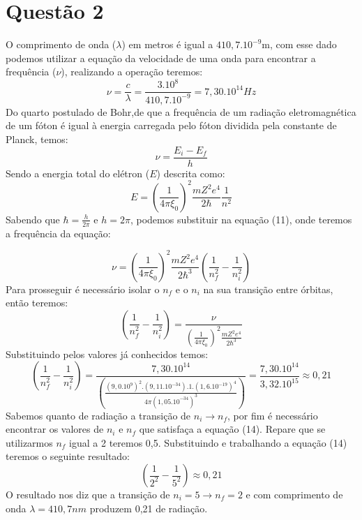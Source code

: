\documentclass{article}
\begin{document}
\section {Questão 2}
O comprimento de onda ($\lambda$) em metros é igual a $410,7.10^{-9}$m, com esse dado podemos utilizar a equação da velocidade de uma onda para encontrar a frequência ($\nu$), realizando a operação teremos:
\begin{equation}
    { \nu = \frac{c}{\lambda} = \frac{3.10^{8}}{410,7.10^{-9}} = 7,30.10^{14}Hz}
\end{equation}
Do quarto postulado de Bohr,de que a frequência de um radiação eletromagnética de um fóton é igual à energia carregada pelo fóton dividida pela constante de Planck, temos: 
\begin{equation}
    { \nu = \frac{E_i - E_f}{h}}  
\end{equation}
Sendo a energia total do elétron ($E$) descrita como:
\begin{equation}
    { E = (\frac{1}{4\pi\xi_0})^{2}\frac{mZ^{2}e^{4}}{2\hbar}\frac{1}{n^{2}}}  
\end{equation}
Sabendo que $\hbar = \frac{h}{2\pi}$ e $h=2\pi$, podemos substituir na equação (11), onde teremos a frequência da equação:

\begin{equation}
     { \nu = (\frac{1}{4\pi\xi_0})^{2}\frac{mZ^{2}e^{4}}{2\hbar^{3}}(\frac{1}{n_f^{2}}-\frac{1}
     {n_i^{2}})}
\end{equation}
Para prosseguir é necessário isolar o $n_f$ e o $n_i$ na sua transição entre órbitas, então teremos:
\begin{equation}
     { (\frac{1}{n_f^{2}}-\frac{1}{n_i^{2}})=\frac{\nu}{ (\frac{1}{4\pi\xi_0})^{2}\frac{mZ^{2}e^{4}}{2\hbar^{3}}}}
\end{equation}
Substituindo pelos valores já conhecidos temos:
\begin{equation}
     { (\frac{1}{n_f^{2}}-\frac{1}{n_i^{2}})=\frac{7,30.10^{14}}{ (\frac{(9,0.10^{9})^{2}.(9,11.10^{-34}).1.(1,6.10^{-19})^{4}}{4\pi(1,05.10^{-34})^{3}})}}=\frac{7,30.10^{14}}{3,32.10^{15}}\approx 0,21
\end{equation}
Sabemos quanto de radiação a transição de $n_i\rightarrow n_f$, por fim é necessário encontrar os valores de $n_i$ e $n_f$ que satisfaça a equação (14). Repare que se utilizarmos $n_f$ igual a 2 teremos 0,5. Substituindo e trabalhando a equação (14) teremos o seguinte resultado:
\begin{equation}
     { (\frac{1}{2^{2}}-\frac{1}{5^{2}})\approx 0,21}
\end{equation}
O resultado nos diz que a transição de  ${n_i = 5}\rightarrow{n_f=2}$ e com comprimento de onda ${\lambda=410,7nm}$ produzem 0,21 de radiação.
\end{document}
